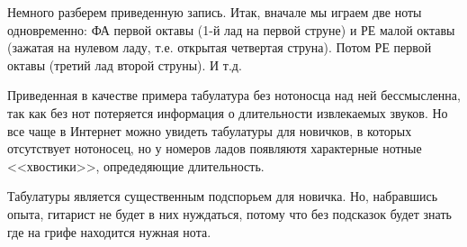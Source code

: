 Немного разберем приведенную запись. Итак, вначале мы играем две ноты одновременно: ФА первой октавы (1-й лад на первой струне) и РЕ малой октавы (зажатая на нулевом ладу, т.е. открытая четвертая струна). Потом РЕ первой октавы (третий лад второй струны). И т.д.

Приведенная в качестве примера табулатура без нотоносца над ней бессмысленна, так как без нот потеряется информация о длительности извлекаемых звуков. Но все чаще в Интернет можно увидеть табулатуры для новичков, в которых отсутствует нотоносец, но у номеров ладов появляютя характерные нотные <<хвостики>>, опредедяющие длительность.

Табулатуры является существенным подспорьем для новичка. Но, набравшись опыта, гитарист не будет в них нуждаться, потому что без подсказок будет знать где на грифе находится нужная нота.
